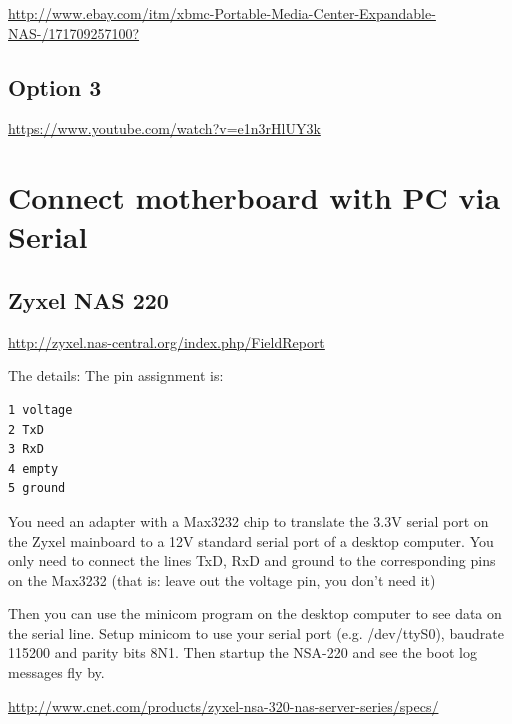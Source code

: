 \url{http://www.ebay.com/itm/xbmc-Portable-Media-Center-Expandable-NAS-/171709257100?}

\subsection{Option 3}

\url{https://www.youtube.com/watch?v=e1n3rHlUY3k}

\section{Connect motherboard with PC via Serial}

\subsection{Zyxel NAS 220}
\label{sec:NAS220-Zyxel}
\label{sec:Zyxel-NAS220}

\url{http://zyxel.nas-central.org/index.php/FieldReport}

The details: The pin assignment is:
\begin{verbatim}
1 voltage
2 TxD
3 RxD
4 empty
5 ground
\end{verbatim}

You need an adapter with a Max3232 chip to translate the 3.3V serial port on the
Zyxel mainboard to a 12V standard serial port of a desktop computer. You only
need to connect the lines TxD, RxD and ground to the corresponding pins on the
Max3232 (that is: leave out the voltage pin, you don't need it)

Then you can use the minicom program on the desktop computer to see data on the
serial line. Setup minicom to use your serial port (e.g. /dev/ttyS0), baudrate
115200 and parity bits 8N1. Then startup the NSA-220 and see the boot log
messages fly by.

\url{http://www.cnet.com/products/zyxel-nsa-320-nas-server-series/specs/}

